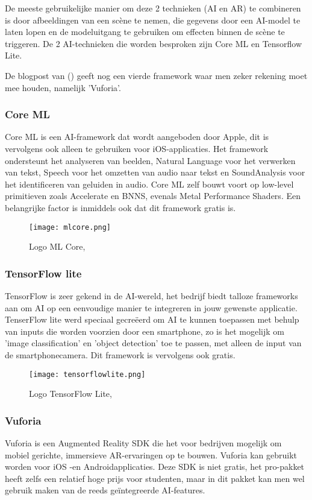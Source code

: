 De meeste gebruikelijke manier om deze 2 technieken (AI en AR) te combineren is door afbeeldingen van een scène te nemen, die gegevens door een AI-model te laten lopen en de modeluitgang te gebruiken om effecten binnen de scène te triggeren. De 2 AI-technieken die worden besproken zijn Core ML en Tensorflow Lite.

De blogpost van \autocite{Girish2020} () geeft nog een vierde framework waar men zeker rekening moet mee houden, namelijk 'Vuforia'.

\subsubsection{Core ML}
Core ML is een AI-framework dat wordt aangeboden door Apple, dit is vervolgens ook alleen te gebruiken voor iOS-applicaties. Het framework ondersteunt het analyseren van beelden, Natural Language voor het verwerken van tekst, Speech voor het omzetten van audio naar tekst en SoundAnalysis voor het identificeren van geluiden in audio. Core ML zelf bouwt voort op low-level primitieven zoals Accelerate en BNNS, evenals Metal Performance Shaders. Een  belangrijke factor is inmiddels ook dat dit framework gratis is. \autocite{AppleML2020}


\begin{figure}[H]
	\centering
	\texttt{[image: mlcore.png]}
	\caption{Logo ML Core, \autocite{AppleML2020}}
\end{figure}

\subsubsection{TensorFlow lite}
TensorFlow is zeer gekend in de AI-wereld, het bedrijf biedt talloze frameworks aan om AI op een eenvoudige manier te integreren in jouw gewenste applicatie. TenserFlow lite werd speciaal gecreëerd om AI te kunnen toepassen met behulp van inputs die worden voorzien door een smartphone, zo is het mogelijk om 'image classification' en 'object detection' toe te passen, met alleen de input van de smartphonecamera. Dit framework is vervolgens ook gratis. \autocite{TensorFlowLite2020}

\begin{figure}[H]
	\centering
	\texttt{[image: tensorflowlite.png]}
	\caption{Logo TensorFlow Lite, \autocite{TensorFlowLite2020}}
\end{figure}

\subsubsection{Vuforia}
Vuforia is een Augmented Reality SDK die het voor bedrijven mogelijk  om mobiel gerichte, immersieve AR-ervaringen op te bouwen. Vuforia kan gebruikt worden voor iOS -en Androidapplicaties. Deze SDK is niet gratis, het pro-pakket heeft zelfs een relatief hoge prijs voor studenten, maar in dit pakket kan men wel gebruik maken van de reeds geïntegreerde AI-features. \autocite{Girish2020}

